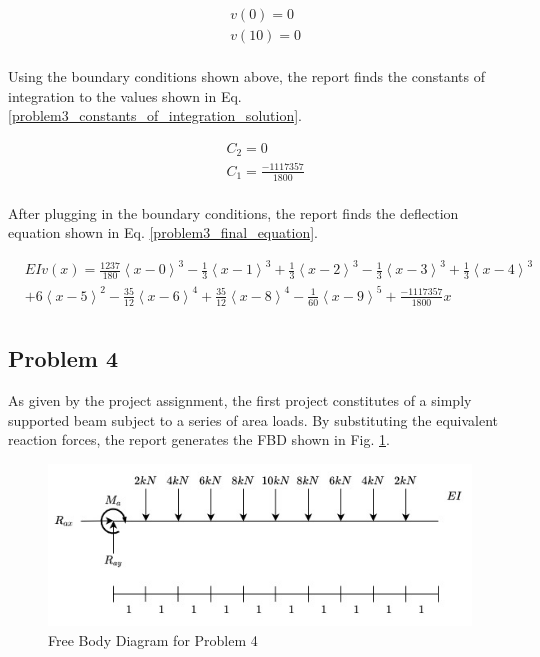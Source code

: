 \documentclass[a4paper]{article}
\begin{document}
\begin{equation}
\begin{split}
	& v(0) = 0 \\
	& v(10) = 0 \\
\end{split}
\label{problem3_constants_of_integration}
\end{equation}

Using the boundary conditions shown above, the report finds the constants of integration to the values shown in Eq. \ref{problem3_constants_of_integration_solution}.

\begin{equation}
\begin{split}
	& C_2 = 0 \\
	& C_1 = \frac{-1117357}{1800} \\
\end{split}
\label{problem3_constants_of_integration_solution}
\end{equation}

After plugging in the boundary conditions, the report finds the deflection equation shown in Eq. \ref{problem3_final_equation}.

\begin{equation}
\begin{split}
  & EI v(x) = \frac{1237}{180}\left<x-0\right>^3 - \frac{1}{3}\left<x-1\right>^3 +  \frac{1}{3}\left<x-2\right>^3 - \frac{1}{3}\left<x-3\right>^3 +  \frac{1}{3}\left<x-4\right>^3\\
& + 6\left<x-5\right>^2 -  \frac{35}{12}\left<x-6\right>^4 + \frac{35}{12}\left<x-8\right>^4  - \frac{1}{60}\left<x-9\right>^5 + \frac{-1117357}{1800}x\\
\end{split}
\label{problem3_final_equation}
\end{equation}





\subsection{Problem 4}

As given by the project assignment, the first project constitutes of a simply supported beam subject to a series of area loads. By substituting the equivalent reaction forces, the report generates the FBD shown in Fig. \ref{FBD_4}.

\begin{figure}[h]
\includegraphics[width=\textwidth]{FBD/FBD_4.jpg}
\caption{Free Body Diagram for Problem 4}
\label{FBD_4}
\end{figure}
\end{document}
